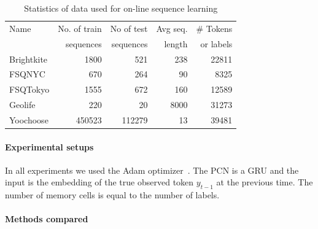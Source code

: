 \documentclass[letterpaper]{article} %
\begin{document}
\begin{table}
\begin{center}
\begin{tabular}{|l|r|r|r|r|} \hline
Name & No. of train & No of test & Avg seq. & \# Tokens \\
         &  sequences & sequences & length &  or labels  \\ \hline
Brightkite & 1800  & 521  & 238  &  22811 \\
FSQNYC & 670  &  264  & 90  &  8325 \\
FSQTokyo & 1555  & 672  & 160  &  12589 \\
Geolife & 220  & 20  & 8000 &   31273\\
Yoochoose &  450523 & 112279  & 13 &   39481\\ \hline
\end{tabular}
\end{center}
\caption{\label{sequence-data} Statistics of data used for on-line sequence learning}
\end{table}
\paragraph*{Experimental setups}
In all experiments we used the Adam optimizer~\cite{KingmaB14}.  The PCN is a GRU and the input is the embedding of the true observed token $y_{t-1}$ at the previous time.
The number of memory cells is equal to the number of labels.



\paragraph*{Methods compared}
\end{document}
